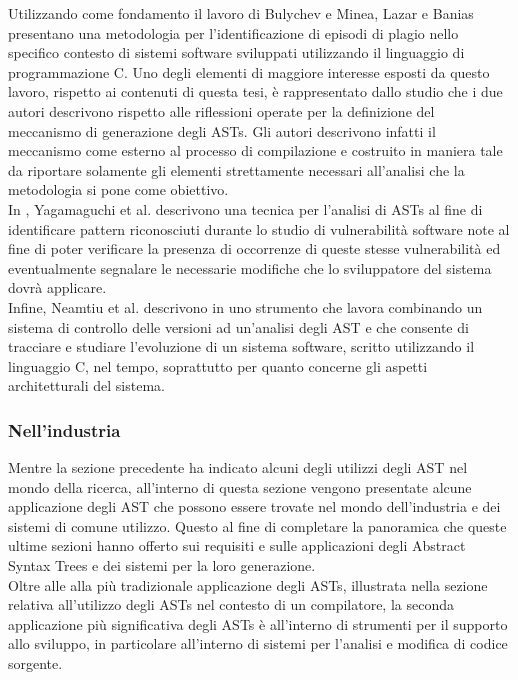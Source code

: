 Utilizzando come fondamento il lavoro di Bulychev e Minea, Lazar e Banias
presentano una metodologia \cite{DBLP:conf/saci/LazarB14} per l’identificazione
di episodi di plagio nello specifico contesto di sistemi software sviluppati
utilizzando il linguaggio di programmazione C. Uno degli elementi di maggiore
interesse esposti da questo lavoro, rispetto ai contenuti di questa tesi, è
rappresentato dallo studio che i due autori descrivono rispetto alle
riflessioni operate per la definizione del meccanismo di generazione degli
ASTs. Gli autori descrivono infatti il meccanismo come esterno al processo di
compilazione e costruito in maniera tale da riportare solamente gli elementi
strettamente necessari all’analisi che la metodologia si pone come obiettivo.\\

In \cite{DBLP:conf/acsac/YamaguchiLR12}, Yagamaguchi et al. descrivono una
tecnica per l’analisi di ASTs al fine di identificare pattern riconosciuti
durante lo studio di vulnerabilità software note al fine di poter verificare la
presenza di occorrenze di queste stesse vulnerabilità ed eventualmente
segnalare le necessarie modifiche che lo sviluppatore del sistema dovrà
applicare.\\

Infine, Neamtiu et al. descrivono in \cite{DBLP:journals/sigsoft/NeamtiuFH05}
uno strumento che lavora combinando un sistema di controllo delle versioni ad
un’analisi degli AST e che consente di tracciare e studiare l’evoluzione di un
sistema software, scritto utilizzando il linguaggio C, nel tempo, soprattutto
per quanto concerne gli aspetti architetturali del sistema.

\subsubsection{Nell’industria}

Mentre la sezione precedente ha indicato alcuni degli utilizzi degli AST nel
mondo della ricerca, all’interno di questa sezione vengono presentate alcune
applicazione degli AST che possono essere trovate nel mondo dell’industria e
dei sistemi di comune utilizzo. Questo al fine di completare la panoramica che
queste ultime sezioni hanno offerto sui requisiti e sulle applicazioni degli
Abstract Syntax Trees e dei sistemi per la loro generazione.\\

Oltre alle alla più tradizionale applicazione degli ASTs, illustrata nella
sezione relativa all’utilizzo degli ASTs nel contesto di un compilatore, la
seconda applicazione più significativa degli ASTs è all’interno di strumenti
per il supporto allo sviluppo, in particolare all’interno di sistemi per
l'analisi e modifica di codice sorgente.\\

